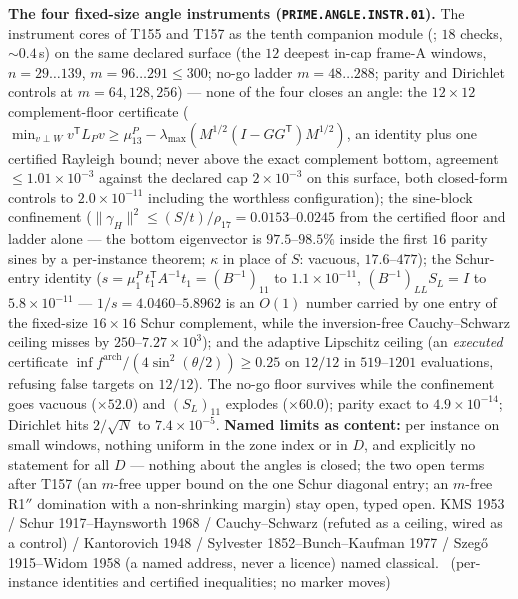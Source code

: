 \par\smallskip\noindent\textbf{The four fixed-size angle instruments
(\texttt{PRIME.ANGLE.INSTR.01}).}
The instrument cores of T155 and T157 as the tenth companion module
(; $18$ checks, ${\sim}0.4$\,s) on the
same declared surface (the $12$ deepest in-cap frame-A windows,
$n=29\ldots139$, $m=96\ldots291\le300$; no-go ladder $m=48\ldots288$;
parity and Dirichlet controls at $m=64,128,256$) --- none of the four
closes an angle: the $12\times12$ complement-floor certificate
($\min_{v\perp W}v^{\mathsf T}L_Pv\ge\mu^P_{13}-\lambda_{\max}(M^{1/2}
(I-GG^{\mathsf T})M^{1/2})$, an identity plus one certified Rayleigh
bound; never above the exact complement bottom, agreement
$\le1.01\times10^{-3}$ against the declared cap $2\times10^{-3}$ on this
surface, both closed-form controls to $2.0\times10^{-11}$ including the
worthless configuration); the sine-block confinement
($\|\gamma_H\|^2\le(S/t)/\rho_{17}=0.0153$--$0.0245$ from the certified
floor and ladder alone --- the bottom eigenvector is $97.5$--$98.5\%$
inside the first $16$ parity sines by a per-instance theorem; $\kappa$
in place of $S$: vacuous, $17.6$--$477$); the Schur-entry identity
($s=\mu^P_1\,t_1^{\mathsf T}A^{-1}t_1=(B^{-1})_{11}$ to
$1.1\times10^{-11}$, $(B^{-1})_{LL}S_L=I$ to $5.8\times10^{-11}$ ---
$1/s=4.0460$--$5.8962$ is an $O(1)$ number carried by one entry of the
fixed-size $16\times16$ Schur complement, while the inversion-free
Cauchy--Schwarz ceiling misses by $250$--$7.27\times10^{3}$); and the
adaptive Lipschitz ceiling (an \emph{executed} certificate
$\inf f^{\mathrm{arch}}/(4\sin^2(\theta/2))\ge0.25$ on $12/12$ in
$519$--$1201$ evaluations, refusing false targets on $12/12$). The no-go
floor survives while the confinement goes vacuous ($\times52.0$) and
$(S_L)_{11}$ explodes ($\times60.0$); parity exact to
$4.9\times10^{-14}$; Dirichlet hits $2/\sqrt N$ to $7.4\times10^{-5}$.
\textbf{Named limits as content:} per instance on small windows, nothing
uniform in the zone index or in $D$, and explicitly no statement for all
$D$ --- nothing about the angles is closed; the two open terms after
T157 (an $m$-free upper bound on the one Schur diagonal entry; an
$m$-free R1$''$ domination with a non-shrinking margin) stay open, typed
open. KMS 1953 / Schur 1917--Haynsworth 1968 / Cauchy--Schwarz (refuted
as a ceiling, wired as a control) / Kantorovich 1948 / Sylvester
1852--Bunch--Kaufman 1977 / Szeg\H{o} 1915--Widom 1958 (a named address,
never a licence) named classical.
\mE\ (per-instance identities and certified inequalities; no marker moves)
\par\smallskip


